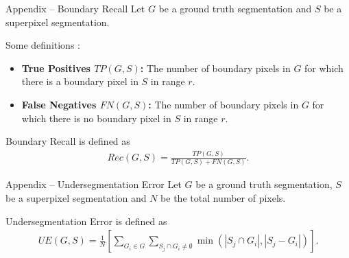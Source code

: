 \documentclass[handout]{beamer}
\begin{document}
	\begin{frame}{Appendix -- Boundary Recall}
		Let $G$ be a ground truth segmentation and $S$ be a superpixel segmentation.
		\vskip 0.25cm
		
		Some definitions \cite{NeubertProtzel:2012}:
		\vskip 0.25cm
		
		\begin{itemize}[label=--]
			\item \textbf{True Positives $TP(G,S)$:} The number of boundary pixels in $G$ for which there is a boundary pixel in $S$ in range $r$.
			\item \textbf{False Negatives $FN(G,S)$:} The number of boundary pixels in $G$ for which there is no boundary pixel in $S$ in range $r$.
		\end{itemize}
		\vskip 0.25cm
		
		Boundary Recall is defined as
		\begin{align}
				Rec(G,S) = \frac{TP(G,S)}{TP(G,S) + FN(G,S)}.
		\end{align}
	\end{frame}
		
	\begin{frame}{Appendix -- Undersegmentation Error}
		Let $G$ be a ground truth segmentation, $S$ be a superpixel segmentation and $N$ be the total number of pixels.
		\vskip 0.25cm
		
		Undersegmentation Error is defined as
		\begin{align}
			UE(G, S) = \frac{1}{N} \left[\sum _{G_i \in G} \sum _{S_j \cap G_i \neq \emptyset} \min (|S_j \cap G_i|, |S_j - G_i|) \right].
		\end{align}
	\end{frame}


	\nocite{*}
	
	
\end{document}

